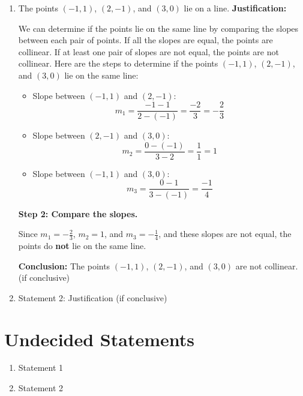 \documentclass{article}
\begin{document}
\begin{enumerate}
    \item The points $(-1,1)$, $(2,-1)$, and $(3,0)$ lie on a line.\newline
          \textbf{Justification:}

          We can determine if the points lie on the same line by comparing the slopes between each pair of points.
          If all the slopes are equal, the points are collinear.
          If at least one pair of slopes are not equal, the points are not collinear.
          Here are the steps to determine if the points \((-1, 1)\), \((2, -1)\), and \((3, 0)\) lie on the same line:

          \begin{itemize}
              \item Slope between \((-1, 1)\) and \((2, -1)\):
                    \[
                        m_1 = \frac{-1 - 1}{2 - (-1)} = \frac{-2}{3} = -\frac{2}{3}
                    \]

              \item Slope between \((2, -1)\) and \((3, 0)\):
                    \[
                        m_2 = \frac{0 - (-1)}{3 - 2} = \frac{1}{1} = 1
                    \]

              \item Slope between \((-1, 1)\) and \((3, 0)\):
                    \[
                        m_3 = \frac{0 - 1}{3 - (-1)} = \frac{-1}{4}
                    \]
          \end{itemize}

          \textbf{Step 2: Compare the slopes.}

          Since \(m_1 = -\frac{2}{3}\), \(m_2 = 1\), and \(m_3 = -\frac{1}{4}\), and these slopes are not equal, the points do \textbf{not} lie on the same line.

          \textbf{Conclusion:} The points \((-1, 1)\), \((2, -1)\), and \((3, 0)\) are not collinear.  (if conclusive)
    \item Statement 2: Justification (if conclusive)
\end{enumerate}

\section{Undecided Statements}

\begin{enumerate}
    \item Statement 1
    \item Statement 2
\end{enumerate}
\end{document}
